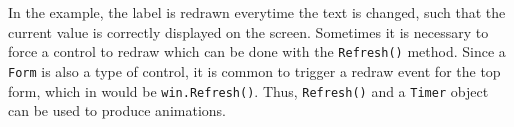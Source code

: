 \documentclass[fsharpnotes.tex]{subfiles}
\begin{document}
In the example, the label is redrawn everytime the text is changed, such that the current value is correctly displayed on the screen. Sometimes it is necessary to force a control to redraw which can be done with the \lstinline{Refresh()} method. Since a \lstinline{Form} is also a type of control, it is common to trigger a redraw event for the top form, which in  would be \lstinline{win.Refresh()}. Thus, \lstinline{Refresh()} and a \lstinline{Timer} object can be used to produce animations.

\clearpage
\end{document}
